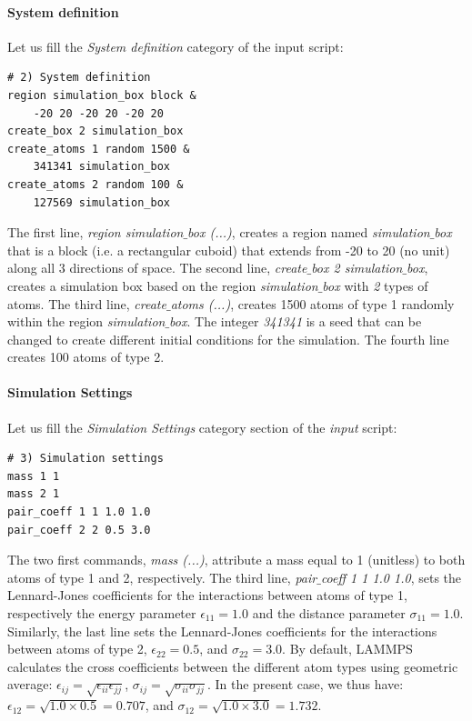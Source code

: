 \documentclass[9pt,tutorial]{livecoms}
\begin{document}
\paragraph{System definition}
Let us fill the \textit{System definition} category of the input script:
{\normalsize \begin{verbatim}
# 2) System definition
region simulation_box block &
    -20 20 -20 20 -20 20
create_box 2 simulation_box
create_atoms 1 random 1500 &
    341341 simulation_box
create_atoms 2 random 100 &
    127569 simulation_box
\end{verbatim}}
\noindent The first line, \textit{region simulation$\_$box (...)}, creates a region named \textit{simulation$\_$box} that is a block (i.e. a rectangular cuboid) that extends from -20 to 20 (no unit) along all 3 directions of space. The second line, \textit{create$\_$box 2 simulation$\_$box}, creates a simulation box based on the region \textit{simulation$\_$box} with \textit{2} types of atoms. The third line, \textit{create$\_$atoms (...)}, creates 1500 atoms of type 1 randomly within the region \textit{simulation$\_$box}. The integer \textit{341341} is a seed that can be changed to create different initial conditions for the simulation. The fourth line creates 100 atoms of type 2.

\paragraph{Simulation Settings}
Let us fill the \textit{Simulation Settings} category section of the \textit{input} script:
{\normalsize \begin{verbatim}
# 3) Simulation settings
mass 1 1
mass 2 1
pair_coeff 1 1 1.0 1.0
pair_coeff 2 2 0.5 3.0
\end{verbatim}}
The two first commands, \textit{mass (...)}, attribute a mass equal to 1 (unitless) to both atoms of type 1 and 2, respectively. The third line, \textit{pair$\_$coeff 1 1 1.0 1.0}, sets the Lennard-Jones coefficients for the interactions between atoms of type 1, respectively the energy parameter $\epsilon_{11} = 1.0$ and the distance parameter $\sigma_{11} = 1.0$. Similarly, the last line sets the Lennard-Jones coefficients for the interactions between atoms of type 2, $\epsilon_{22} = 0.5$, and $\sigma_{22} = 3.0$. By default, LAMMPS calculates the cross coefficients between the different atom types using geometric average: $\epsilon_{ij} = \sqrt{\epsilon_{ii} \epsilon_{jj}}$, $\sigma_{ij} = \sqrt{\sigma_{ii} \sigma_{jj}}$. In the present case, we thus have: $\epsilon_{12} = \sqrt{1.0 \times 0.5} = 0.707$, and $\sigma_{12} = \sqrt{1.0 \times 3.0} = 1.732$.
\end{document}
